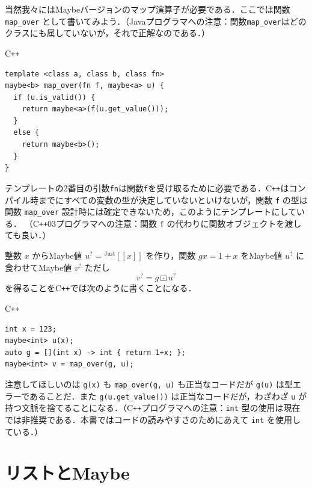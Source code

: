 \documentclass[a4paper,twocolumn]{jsbook}
\def\[{\left[\!\left[}
\def\]{\right]\!\right]}
\newcommand{\programminglanguage}[1]{\textsf{#1}}
\newcommand{\cxx}{\programminglanguage{C}\texttt{++}}
\newcommand{\cxxzerothree}{\cxx\programminglanguage{03}}
\newcommand{\java}{\programminglanguage{Java}}
\newcommand{\code}[1]{\texttt{#1}}
\newenvironment{cxxcode}{\begin{itembox}[r]{\cxx}}{\end{itembox}}
\DeclareMathOperator{\mMapMaybe}{\boxdot}
\newcommand{\mGenericValueConstructor}[1]{\mathrm{#1}}
\newcommand{\mGenericWith}[2]{{}^\mGenericValueConstructor{#1}\[#2\]}
\newcommand{\mJustWith}[1]{\mGenericWith{Just}{#1}}
\newcommand{\mMaybe}[1]{{#1}^?}
\begin{document}
当然我々にはMaybeバージョンのマップ演算子が必要である．ここでは関数 \code{map\_over} として書いてみよう．（\java プログラマへの注意：関数\code{map\_over}はどのクラスにも属していないが，それで正解なのである．）
\begin{cxxcode}
\begin{verbatim}
template <class a, class b, class fn>
maybe<b> map_over(fn f, maybe<a> u) {
  if (u.is_valid()) {
    return maybe<a>(f(u.get_value()));
  }
  else {
    return maybe<b>();
  }
}
\end{verbatim}
\end{cxxcode}
テンプレートの2番目の引数\code{fn}は関数\code{f}を受け取るために必要である．\cxx はコンパイル時までにすべての変数の型が決定していないといけないが，関数 \code{f} の型は関数 \code{map\_over} 設計時には確定できないため，このようにテンプレートにしている．
（\cxxzerothree プログラマへの注意：関数 \code{f} の代わりに関数オブジェクトを渡しても良い．）

整数 $x$ からMaybe値 $\mMaybe{u}=\mJustWith{x}$ を作り，関数 $gx=1+x$ をMaybe値 $\mMaybe{u}$ に食わせてMaybe値 $\mMaybe{v}$ ただし
\begin{equation}
\mMaybe{v}=g\mMapMaybe\mMaybe{u}
\end{equation}
を得ることを\cxx では次のように書くことになる．
\begin{cxxcode}
\begin{verbatim}
int x = 123;
maybe<int> u(x);
auto g = [](int x) -> int { return 1+x; };
maybe<int> v = map_over(g, u);
\end{verbatim}
\end{cxxcode}
注意してほしいのは \code{g(x)} も \code{map\_over(g, u)} も正当なコードだが \code{g(u)} は型エラーであることだ．また \code{g(u.get\_value())} は正当なコードだが，わざわざ \code{u} が持つ文脈を捨てることになる．（\cxx プログラマへの注意：\code{int} 型の使用は現在では非推奨である．本書ではコードの読みやすさのためにあえて \code{int} を使用している．）


\section{リストとMaybe}
\end{document}
